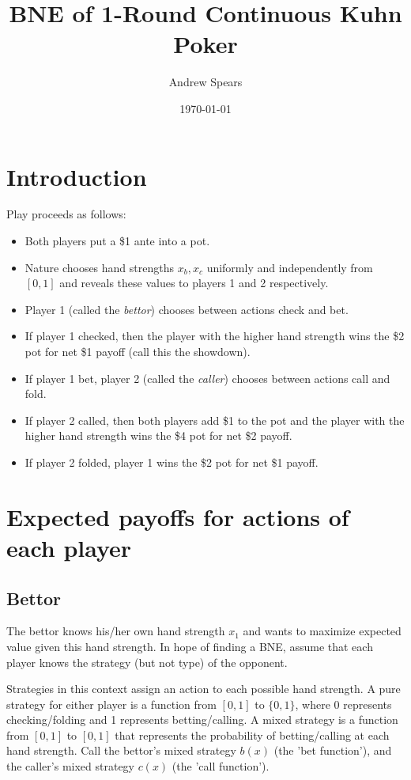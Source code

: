 \documentclass[a4paper,12pt]{article}
\title{BNE of 1-Round Continuous Kuhn Poker}
\author{Andrew Spears}
\date{\today}
\begin{document}
\maketitle

\section{Introduction}

Play proceeds as follows:

\begin{itemize}
    \item Both players put a \$1 ante into a pot.
    \item Nature chooses hand strengths $x_b, x_c$ uniformly and independently from $[0, 1]$ and reveals these values to players 1 and 2 respectively. 
    \item Player 1 (called the \textit{bettor}) chooses between actions check and bet.
    \item If player 1 checked, then the player with the higher hand strength wins the \$2 pot for net \$1 payoff (call this the showdown).
    \item If player 1 bet, player 2 (called the \textit{caller}) chooses between actions call and fold.
    \item If player 2 called, then both players add \$1 to the pot and the player with the higher hand strength wins the \$4 pot for net \$2 payoff.
    \item If player 2 folded, player 1 wins the \$2 pot for net \$1 payoff.
\end{itemize}

\section{Expected payoffs for actions of each player}

\subsection{Bettor}

The bettor knows his/her own hand strength $x_1$ and wants to maximize expected value given this hand strength. In hope of finding a BNE, assume that each player knows the strategy (but not type) of the opponent. 

Strategies in this context assign an action to each possible hand strength. A pure strategy for either player is a function from $[0, 1]$ to $\{0, 1\}$, where 0 represents checking/folding and 1 represents betting/calling. A mixed strategy is a function from $[0, 1]$ to $[0, 1]$ that represents the probability of betting/calling at each hand strength. Call the bettor's mixed strategy $b(x)$ (the 'bet function'), and the caller's mixed strategy $c(x)$ (the 'call function').
\end{document}
